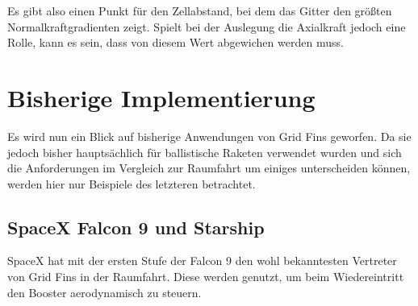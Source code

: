 Es gibt also einen Punkt für den Zellabstand, bei dem das Gitter den größten Normalkraftgradienten zeigt. Spielt bei der Auslegung die Axialkraft jedoch eine Rolle, kann es sein, dass von diesem Wert abgewichen werden muss.

\section{Bisherige Implementierung}
Es wird nun ein Blick auf bisherige Anwendungen von Grid Fins geworfen. Da sie jedoch bisher hauptsächlich für ballistische Raketen verwendet wurden und sich die Anforderungen im Vergleich zur Raumfahrt um einiges unterscheiden können, werden hier nur Beispiele des letzteren betrachtet.
\subsection{SpaceX Falcon 9 und Starship}
SpaceX hat mit der ersten Stufe der Falcon 9 den wohl bekanntesten Vertreter von Grid Fins in der Raumfahrt. Diese werden genutzt, um beim Wiedereintritt den Booster aerodynamisch zu steuern. 

